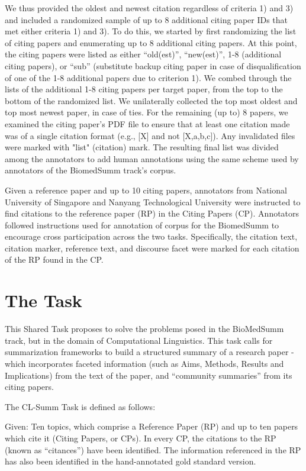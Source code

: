 \documentclass[11pt]{article}
\begin{document}
We thus provided the oldest and newest citation regardless of criteria 
1) and 3) and included a randomized sample of up to 8 additional citing 
paper IDs that met either criteria 1) and 3). To do this, we started by 
first randomizing the list of citing papers and enumerating up to 8 
additional citing papers. At this point, the citing papers were listed 
as either ``old(est)'', ``new(est)'', 1-8 (additional citing papers),  
or ``sub'' (substitute backup citing paper in case of disqualification of 
one of the 1-8 additional papers due to criterion 1). We combed through the 
lists of the additional 1-8 citing papers per target paper, from the top to 
the bottom of the randomized list.  We unilaterally collected the top most 
oldest and top most newest paper, in case of ties.  For the remaining (up to) 
8 papers, we examined the citing paper's PDF file to ensure that at least one 
citation made was of a single citation format (e.g., [X] and not [X,a,b,c]). 
Any invalidated files were marked with "list" (citation) mark. The resulting 
final list was divided among the annotators to add human annotations using the 
same scheme used by annotators of the BiomedSumm track's corpus.

Given a reference paper and up to 10 citing papers, annotators from 
National University of Singapore and Nanyang Technological University 
were instructed to find citations to the reference paper (RP) in the 
Citing Papers (CP). Annotators followed instructions used for annotation of corpus 
for the BiomedSumm to encourage cross participation across the two tasks. 
Specifically, the citation text, citation marker, reference text, and 
discourse facet were marked for each citation of the RP found in the CP.

\section{The Task}
This Shared Task proposes to solve the problems posed in the BioMedSumm track, but in the domain of Computational Linguistics. This task calls for summarization frameworks to build a structured summary of a research paper - which incorporates faceted information (such as Aims, Methods, Results and Implications) from the text of the paper, and ``community summaries'' from its citing papers.

The CL-Summ Task is defined as follows:

Given: Ten topics, which comprise a Reference Paper (RP) and up to ten papers which cite it (Citing Papers, or CPs). In every CP, the citations to the RP (known as ``citances'') have been identified. The information referenced in the RP has also been identified in the hand-annotated gold standard version.
\end{document}
